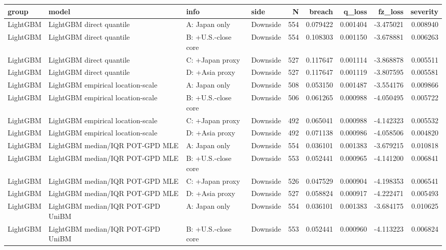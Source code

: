 \begin{tabular}{lll lrrrrr}
\toprule
group & model & info & side & N & breach & q_loss & fz_loss & severity \\
\midrule
LightGBM & LightGBM direct quantile & A: Japan only & Downside & 554 & 0.079422 & 0.001404 & -3.475021 & 0.008940 \\
LightGBM & LightGBM direct quantile & B: +U.S.-close core & Downside & 554 & 0.108303 & 0.001150 & -3.678881 & 0.006263 \\
LightGBM & LightGBM direct quantile & C: +Japan proxy & Downside & 527 & 0.117647 & 0.001114 & -3.868878 & 0.005511 \\
LightGBM & LightGBM direct quantile & D: +Asia proxy & Downside & 527 & 0.117647 & 0.001119 & -3.807595 & 0.005581 \\
LightGBM & LightGBM empirical location-scale & A: Japan only & Downside & 508 & 0.053150 & 0.001487 & -3.554176 & 0.009866 \\
LightGBM & LightGBM empirical location-scale & B: +U.S.-close core & Downside & 506 & 0.061265 & 0.000988 & -4.050495 & 0.005722 \\
LightGBM & LightGBM empirical location-scale & C: +Japan proxy & Downside & 492 & 0.065041 & 0.000988 & -4.142323 & 0.005532 \\
LightGBM & LightGBM empirical location-scale & D: +Asia proxy & Downside & 492 & 0.071138 & 0.000986 & -4.058506 & 0.004820 \\
LightGBM & LightGBM median/IQR POT-GPD MLE & A: Japan only & Downside & 554 & 0.036101 & 0.001383 & -3.679215 & 0.010818 \\
LightGBM & LightGBM median/IQR POT-GPD MLE & B: +U.S.-close core & Downside & 553 & 0.052441 & 0.000965 & -4.141200 & 0.006841 \\
LightGBM & LightGBM median/IQR POT-GPD MLE & C: +Japan proxy & Downside & 526 & 0.047529 & 0.000904 & -4.198353 & 0.006541 \\
LightGBM & LightGBM median/IQR POT-GPD MLE & D: +Asia proxy & Downside & 527 & 0.058824 & 0.000917 & -4.222471 & 0.005493 \\
LightGBM & LightGBM median/IQR POT-GPD UniBM & A: Japan only & Downside & 554 & 0.036101 & 0.001383 & -3.684175 & 0.010625 \\
LightGBM & LightGBM median/IQR POT-GPD UniBM & B: +U.S.-close core & Downside & 553 & 0.052441 & 0.000960 & -4.113223 & 0.006824 \\

\end{tabular}
